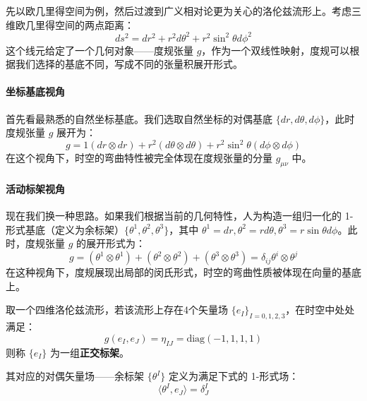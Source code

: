 先以欧几里得空间为例，然后过渡到广义相对论更为关心的洛伦兹流形上。考虑三维欧几里得空间的两点距离：
\begin{equation}
    ds^2 = dr^2 + r^2 d\theta^2 + r^2 \sin^2\theta d\phi^2
\end{equation}
这个线元给定了一个几何对象——度规张量 $g$，作为一个双线性映射，度规可以根据我们选择的基底不同，写成不同的张量积展开形式。

\paragraph{坐标基底视角}
首先看最熟悉的自然坐标基底。我们选取自然坐标的对偶基底 $\{dr, d\theta, d\phi\}$，此时度规张量 $g$ 展开为：
\begin{equation}
    g = 1 (dr \otimes dr) + r^2 (d\theta \otimes d\theta) + r^2\sin^2\theta (d\phi \otimes d\phi)
\end{equation}
在这个视角下，时空的弯曲特性被完全体现在度规张量的分量 $g_{\mu\nu}$ 中。

\paragraph{活动标架视角}
现在我们换一种思路。如果我们根据当前的几何特性，人为构造一组归一化的 1-形式基底（定义为余标架）$\{\theta^1, \theta^2, \theta^3\}$，其中 $\theta^1 = dr, \theta^2 = r d\theta, \theta^3 = r\sin\theta d\phi$。此时，度规张量 $g$ 的展开形式为：
\begin{equation}
    g = (\theta^1 \otimes \theta^1) + (\theta^2 \otimes \theta^2) + (\theta^3 \otimes \theta^3) = \delta_{ij} \theta^i \otimes \theta^j
\end{equation}
在这种视角下，度规展现出局部的闵氏形式，时空的弯曲性质被体现在向量的基底上。

\begin{definition}[正交标架与余标架]
    取一个四维洛伦兹流形，若该流形上存在4个矢量场 $\{e_I\}_{I=0,1,2,3}$，在时空中处处满足：
    \begin{equation}
        g(e_I, e_J) = \eta_{IJ} = \text{diag}(-1, 1, 1, 1)
    \end{equation}
    则称 $\{e_I\}$ 为一组\textbf{正交标架}。
    
    其对应的对偶矢量场——余标架 $\{\theta^I\}$ 定义为满足下式的 1-形式场：
    \begin{equation}
        \langle \theta^I, e_J \rangle = \delta^I_J
    \end{equation}
\end{definition}

